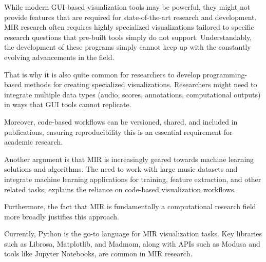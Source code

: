 While modern GUI-based visualization tools may be powerful, they might not provide features that are required for state-of-the-art research and development. MIR research often requires highly specialized visualizations tailored to specific research questions that pre-built tools simply do not support. Understandably, the development of these programs simply cannot keep up with the constantly evolving advancements in the field.

That is why it is also quite common for researchers to develop programming-based methods for creating specialized visualizations. Researchers might need to integrate multiple data types (audio, scores, annotations, computational outputs) in ways that GUI tools cannot replicate.

Moreover, code-based workflows can be versioned, shared, and included in publications, ensuring reproducibility this is an essential requirement for academic research.

Another argument is that MIR is increasingly geared towards machine learning solutions and algorithms. The need to work with large music datasets and integrate machine learning applications for training, feature extraction, and other related tasks, explains the reliance on code-based visualization workflows.

Furthermore, the fact that MIR is fundamentally a computational research field more broadly justifies this approach.

Currently, Python is the go-to language for MIR visualization tasks. Key libraries such as Librosa, Matplotlib, and Madmom, along with APIs such as Modusa and tools like Jupyter Notebooks, are common in MIR research.



